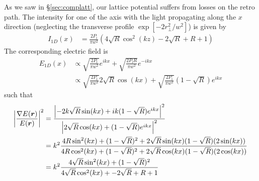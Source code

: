 \vspace{1em} As we saw in \S\ref{sec:complatt}, our lattice potential suffers
from losses on the retro path.  The intensity for one of the axis with the
light propagating along the $x$ direction (neglecting the transverse profile
$\exp[-2r_{\perp}^{2}/w^{2}]$) is given by 
\begin{equation}
\begin{split}
 I_{1D}(x) 
   & = 
\frac{2 P_{\text{i}}}{\pi w^{2}} 
  \left( 4\sqrt{R}\cos^{2}(kz) - 2\sqrt{R} +R+1\right)
\end{split}
\label{eq:I1D} 
\end{equation}
The corresponding electric field is 
\begin{equation}
\begin{split}
 E_{1D}(x) & \propto  \sqrt{\frac{2P_{\text{i}} }{\pi w^{2}}}
  e^{ikx} + \sqrt{ \frac{2P_{\text{i}}R }{ \pi w^{2} } } e^{-ikx}  \\
   & \propto 
    \sqrt{\frac{2P_{\text{i}} }{\pi w^{2}}} 2\sqrt{R}  \cos(kx) + 
    \sqrt{\frac{2P_{\text{i}} }{\pi w^{2}}} (1-\sqrt{R})e^{ikx}
\end{split} 
\end{equation}
such that
\begin{equation}
\begin{split} 
    \left| 
   \frac{ \nabla E(\bm{r}) }
        {  E(\bm{r})} 
    \right|^{2} &  =  \frac{  \left|   
    -2k\sqrt{R} \sin(kx) +  ik(1-\sqrt{R}) e^{ikx}   \right|^{2} }
    { \left| 2\sqrt{R} \cos(kx) + (1-\sqrt{R})e^{ikx} \right|^{2}}   \\ 
   &  = k^{2}
    \frac{   4R\sin^{2}(kx) + (1-\sqrt{R})^{2} +  
            2\sqrt{R}\sin(kx) (1-\sqrt{R})( 2\sin(kx) )  }
    {  4R\cos^{2}(kx)  +  (1-\sqrt{R})^{2} +
            2\sqrt{R}\cos(kx)(1-\sqrt{R}) ( 2\cos(kx) )  } \\
   &  = k^{2}
    \frac{   4\sqrt{R}\sin^{2}(kx) + (1-\sqrt{R})^{2} 
             }
    {  4\sqrt{R}\cos^{2}(kx)  +  - 2\sqrt{R} + R + 1   
             }
\end{split} 
\end{equation}

